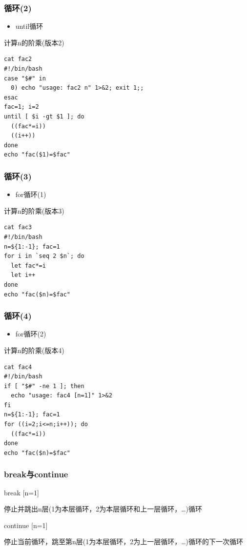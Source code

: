 \documentclass[xcolor=svgnames,presentation]{beamer}
\begin{document}
\begin{frame}[fragile]
\frametitle{循环(2)}
\label{sec-1-2-34}
\begin{itemize}

\item until循环
\label{sec-1-2-34-1}%
\end{itemize} %
\begin{exampleblock}{计算n的阶乘(版本2)}
\label{sec-1-2-34-2}


\begin{verbatim}
cat fac2
#!/bin/bash
case "$#" in
  0) echo "usage: fac2 n" 1>&2; exit 1;;
esac
fac=1; i=2
until [ $i -gt $1 ]; do
  ((fac*=i))
  ((i++))
done
echo "fac($1)=$fac"
\end{verbatim}
\end{exampleblock}
\end{frame}
\begin{frame}[fragile]
\frametitle{循环(3)}
\label{sec-1-2-35}
\begin{itemize}

\item for循环(1)
\label{sec-1-2-35-1}%
\end{itemize} %
\begin{exampleblock}{计算n的阶乘(版本3)}
\label{sec-1-2-35-2}


\begin{verbatim}
cat fac3
#!/bin/bash
n=${1:-1}; fac=1
for i in `seq 2 $n`; do
  let fac*=i
  let i++
done
echo "fac($n)=$fac"
\end{verbatim}
\end{exampleblock}
\end{frame}
\begin{frame}[fragile]
\frametitle{循环(4)}
\label{sec-1-2-36}
\begin{itemize}

\item for循环(2)
\label{sec-1-2-36-1}%
\end{itemize} %
\begin{exampleblock}{计算n的阶乘(版本4)}
\label{sec-1-2-36-2}


\begin{verbatim}
cat fac4
#!/bin/bash
if [ "$#" -ne 1 ]; then
  echo "usage: fac4 [n=1]" 1>&2
fi
n=${1:-1}; fac=1
for ((i=2;i<=n;i++)); do
  ((fac*=i))
done
echo "fac($n)=$fac"
\end{verbatim}
\end{exampleblock}
\end{frame}
\begin{frame}
\frametitle{break与continue}
\label{sec-1-2-37}
\begin{exampleblock}{break [n=1]}
\label{sec-1-2-37-1}

停止并跳出n层(1为本层循环，2为本层循环和上一层循环，\ldots{})循环
\end{exampleblock}
\begin{block}{continue [n=1]}
\label{sec-1-2-37-2}

停止当前循环，跳至第n层(1为本层循环，2为上一层循环，\ldots{})循环的下一次循环
\end{block}
\end{frame}
\end{document}
